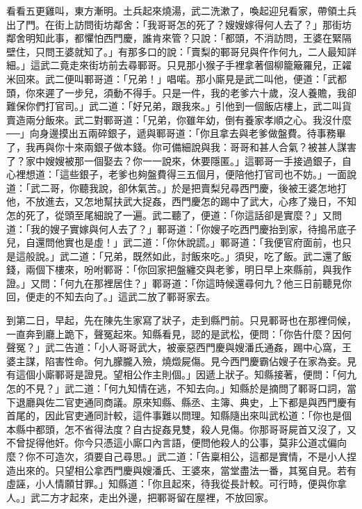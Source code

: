 \begin{showcontents}{}
看看五更雞叫，東方漸明。土兵起來燒湯，武二洗漱了，喚起迎兒看家，帶領土兵出了門。在街上訪問街坊鄰舍：「我哥哥怎的死了？嫂嫂嫁得何人去了？」那街坊鄰舍明知此事，都懼怕西門慶，誰肯來管？只說：「都頭，不消訪問，王婆在緊隔壁住，只問王婆就知了。」有那多口的說：「賣梨的鄆哥兒與仵作何九，二人最知詳細。」這武二竟走來街坊前去尋鄆哥。只見那小猴子手裡拿著個柳籠簸羅兒，正糴米回來。武二便叫鄆哥道：「兄弟！」唱喏。那小廝見是武二叫他，便道：「武都頭，你來遲了一步兒，須動不得手。只是一件，我的老爹六十歲，沒人養贍，我卻難保你們打官司。」武二道：「好兄弟，跟我來。」引他到一個飯店樓上，武二叫貨賣造兩分飯來。武二對鄆哥道：「兄弟，你雖年幼，倒有養家孝順之心。我沒什麼──」向身邊摸出五兩碎銀子，遞與鄆哥道：「你且拿去與老爹做盤費。待事務畢了，我再與你十來兩銀子做本錢。你可備細說與我：哥哥和甚人合氣？被甚人謀害了？家中嫂嫂被那一個娶去？你一一說來，休要隱匿。」這鄆哥一手接過銀子，自心裡想道：「這些銀子，老爹也夠盤費得三五個月，便陪他打官司也不妨。」一面說道：「武二哥，你聽我說，卻休氣苦。」於是把賣梨兒尋西門慶，後被王婆怎地打他，不放進去，又怎地幫扶武大捉姦，西門慶怎的踢中了武大，心疼了幾日，不知怎的死了，從頭至尾細說了一遍。武二聽了，便道：「你這話卻是實麼？」又問道：「我的嫂子實嫁與何人去了？」鄆哥道：「你嫂子吃西門慶抬到家，待搗吊底子兒，自還問他實也是虛！」武二道：「你休說謊。」鄆哥道：「我便官府面前，也只是這般說。」武二道：「兄弟，既然如此，討飯來吃。」須臾，吃了飯。武二還了飯錢，兩個下樓來，吩咐鄆哥：「你回家把盤纏交與老爹，明日早上來縣前，與我作證。」又問：「何九在那裡居住？」鄆哥道：「你這時候還尋何九？他三日前聽見你回，便走的不知去向了。」這武二放了鄆哥家去。

到第二日，早起，先在陳先生家寫了狀子，走到縣門前。只見鄆哥也在那裡伺候，一直奔到廳上跪下，聲冤起來。知縣看見，認的是武松，便問：「你告什麼？因何聲冤？」武二告道：「小人哥哥武大，被豪惡西門慶與嫂潘氏通姦，踢中心窩，王婆主謀，陷害性命。何九朦朧入殮，燒燬屍傷。見今西門慶霸佔嫂子在家為妾。見有這個小廝鄆哥是證見。望相公作主則個。」因遞上狀子。知縣接著，便問：「何九怎的不見？」武二道：「何九知情在逃，不知去向。」知縣於是摘問了鄆哥口詞，當下退廳與佐二官吏通同商議。原來知縣、縣丞、主簿、典史，上下都是與西門慶有首尾的，因此官吏通同計較，這件事難以問理。知縣隨出來叫武松道：「你也是個本縣中都頭，怎不省得法度？自古捉姦見雙，殺人見傷。你那哥哥屍首又沒了，又不曾捉得他奸。你今只憑這小廝口內言語，便問他殺人的公事，莫非公道忒偏向麼？你不可造次，須要自己尋思。」武二道：「告稟相公，這都是實情，不是小人捏造出來的。只望相公拿西門慶與嫂潘氏、王婆來，當堂盡法一番，其冤自見。若有虛誣，小人情願甘罪。」知縣道：「你且起來，待我從長計較。可行時，便與你拿人。」武二方才起來，走出外邊，把鄆哥留在屋裡，不放回家。


\end{showcontents}
